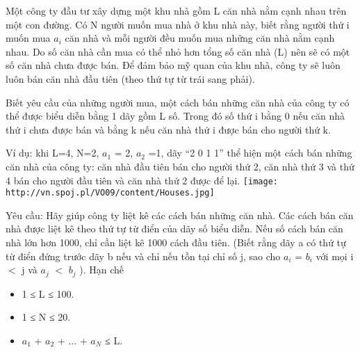 Một công ty đầu tư xây dựng một khu nhà gồm L căn nhà nằm cạnh nhau trên một con đường. Có N người muốn mua nhà ở khu nhà này, biết rằng người thứ i muốn mua $a_{i}$        căn nhà và mỗi người đều muốn mua những căn nhà nằm cạnh nhau. Do số căn nhà cần mua có thể nhỏ hơn tổng số căn nhà (L) nên sẽ có một số căn nhà chưa được bán. Để đảm bảo mỹ quan của khu nhà, công ty sẽ luôn luôn bán căn nhà đầu tiên (theo thứ tự từ trái sang phải).       

        Biết yêu cầu của những người mua, một cách bán những căn nhà của công ty có thể được biểu diễn bằng 1 dãy gồm L số. Trong đó số thứ i bằng 0 nếu căn nhà thứ i chưa được bán và bằng k nếu căn nhà thứ i được bán cho người thứ k.       

        Ví dụ: khi L=4, N=2, $a_{1}$        = 2, $a_{2}$        =1, dãy “2 0 1 1” thể hiện một cách bán những căn nhà của công ty: căn nhà đầu tiên bán cho người thứ 2, căn nhà thứ 3 và thứ 4 bán cho người đầu tiên và căn nhà thứ 2 được để lại.       
\texttt{[image: http://vn.spoj.pl/VO09/content/Houses.jpg]}



   Yêu cầu: Hãy giúp công ty liệt kê các cách bán những căn nhà. Các cách bán căn nhà được liệt kê theo thứ tự từ điển của dãy số biểu diễn. Nếu số cách bán căn nhà lớn hơn 1000, chỉ cần liệt kê 1000 cách đầu tiên. (Biết rằng dãy a có thứ tự từ điển đứng trước dãy b nếu và chỉ nếu tồn tại chỉ số j, sao cho $a_{i}$   = $b_{i}$   với mọi i $<$ j và $a_{j}$   $<$ $b_{j}$   ).
Hạn chế
\begin{itemize}
	\item     1 ≤ L ≤ 100.   
	\item     1 ≤ N ≤ 20.   
	\item     $a_{1}$    + $a_{2}$    + ... + $a_{N}$    ≤ L.   
\end{itemize}